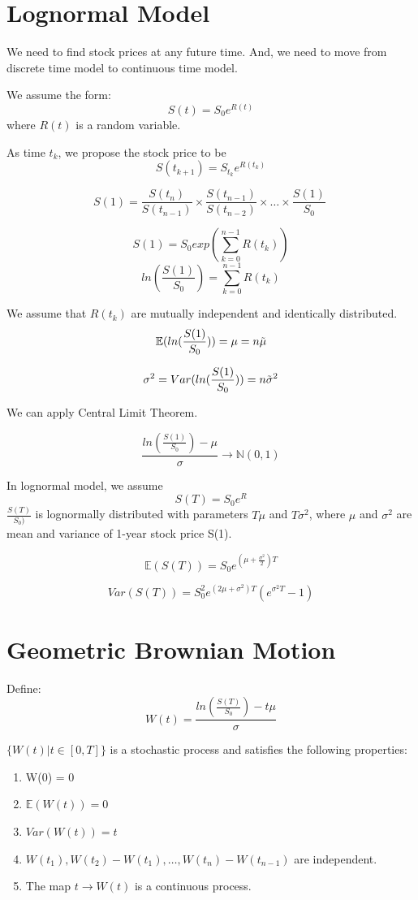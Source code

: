 \documentclass{report}
\begin{document}
\section{Lognormal Model}
We need to find stock prices at any future time. And, we need to move from discrete time model to continuous time model.

We assume the form:
\[S(t) = S_0e^{R(t)}\]
where $R(t)$ is a random variable.

As time $t_k$, we propose the stock price to be 
\[S(t_{k+1}) = S_{t_k}e^{R(t_k)}\]

\[S(1) = \frac{S(t_n)}{S(t_{n-1})} \times \frac{S(t_{n-1})}{S(t_{n-2})} \times \dots \times \frac{S(1)}{S_0}\
\]


\[S(1) = S_0 exp(\sum_{k=0}^{n-1}R(t_k))\]
\[ln(\frac{S(1)}{S_0}) = \sum_{k=0}^{n-1}R(t_k) \]


We assume that $R(t_k)$ are mutually independent and identically distributed. 
\[\mathbb{E}(ln(\frac{S(1)}{S_0})) = \mu = n\Tilde{\mu}\]

\[\sigma^2 = Var(ln(\frac{S(1)}{S_0})) = n\Tilde{\sigma}^2\]

We can apply Central Limit Theorem.


\[
\frac{ln(\frac{S(1)}{S_0})-\mu}{\sigma} \rightarrow \mathbb{N}(0, 1)
\]


In lognormal model, we assume 
\[S(T) = S_0e^R\]
$\frac{S(T)}{S_0)}$ is lognormally distributed with parameters $T\mu$ and $T\sigma^2$, where $\mu$ and $\sigma^2$ are mean and variance of 1-year stock price S(1).



\begin{equation}
    \mathbb{E}(S(T)) = S_0e^{(\mu+\frac{\sigma^2}{2})T}
\end{equation}

\begin{equation}
    Var(S(T)) = S_0^2e^{(2\mu+\sigma^2)T}(e^{\sigma^2T}-1)
\end{equation}


\section{Geometric Brownian Motion}
Define:
\[W(t) = \frac{ln(\frac{S(T)}{S_0})-t\mu}{\sigma}\]

$\{W(t) | t\in [0,T]\}$ is a stochastic process and satisfies the following properties:
\begin{enumerate}
    \item W(0) = 0
    \item $\mathbb{E}(W(t)) = 0$
    \item $Var(W(t)) = t$
    \item $W(t_1), W(t_2) - W(t_1), \dots, W(t_n) - W(t_{n-1})$ are independent.
    \item The map $t \rightarrow W(t)$ is a continuous process.
\end{enumerate}
\end{document}

